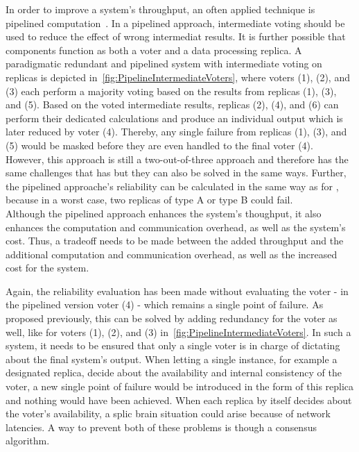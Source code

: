 In order to improve a system's throughput, an often applied technique is pipelined computation~.
In a pipelined approach, intermediate voting should be used to reduce the effect of wrong intermediat results.
It is further possible that components function as both a voter and a data processing replica.
A paradigmatic redundant and pipelined system with intermediate voting on replicas is depicted in~\autoref{fig:PipelineIntermediateVoters}, where voters (1), (2), and (3) each perform a majority voting based on the results from replicas (1), (3), and (5).
Based on the voted intermediate results, replicas (2), (4), and (6) can perform their dedicated calculations and produce an individual output which is later reduced by voter (4).
Thereby, any single failure from replicas (1), (3), and (5) would be masked before they are even handled to the final voter (4).
However, this approach is still a two-out-of-three approach and therefore has the same challenges that  has but they can also be solved in the same ways.
Further, the pipelined approache's reliability can be calculated in the same way as for , because in a worst case, two replicas of type A or type B could fail.
\\

Although the pipelined approach enhances the system's thoughput, it also enhances the computation and communication overhead, as well as the system's cost.
Thus, a tradeoff needs to be made between the added throughput and the additional computation and communication overhead, as well as the increased cost for the system.

Again, the reliability evaluation has been made without evaluating the voter - in the pipelined version voter (4) - which remains a single point of failure.
As proposed previously, this can be solved by adding redundancy for the voter as well, like for voters (1), (2), and (3) in~\autoref{fig:PipelineIntermediateVoters}.
In such a system, it needs to be ensured that only a single voter is in charge of dictating about the final system's output.
When letting a single instance, for example a designated replica, decide about the availability and internal consistency of the voter, a new single point of failure would be introduced in the form of this replica and nothing would have been achieved.
When each replica by itself decides about the voter's availability, a splic brain situation could arise because of network latencies.
A way to prevent both of these problems is though a consensus algorithm.

